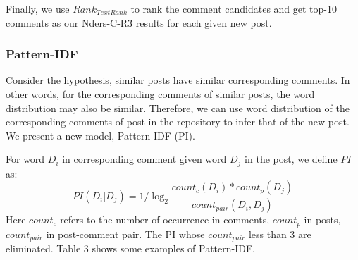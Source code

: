 \documentclass{sig-alternate}
\begin{document}
Finally, we use $Rank_{TextRank}$ to rank the comment candidates and get top-10 comments as our Nders-C-R3 results for each given new post.

\subsubsection{Pattern-IDF}
Consider the hypothesis, similar posts have similar corresponding comments. In 
other words, for the corresponding comments of similar posts, the word 
distribution may also be similar. Therefore, we can use word distribution of 
the corresponding comments of post in the repository to infer that of the new post. We present a new model, Pattern-IDF (PI).

For word $D_i$ in corresponding comment given word $D_j$ in the post, we define $PI$ as:
\begin{equation}
  PI(D_i|D_j) = 1 / \log_{2}{\frac{count_c(D_i) * count_p(D_j)}{count_{pair}(D_i, D_j)}}
\end{equation}
Here $count_c$ refers to the number of occurrence in comments, $count_p$ in posts, $count_{pair}$ in post-comment pair. The PI whose $count_{pair}$ less than 3 are eliminated. Table 3 shows some examples of Pattern-IDF.
\end{document}
